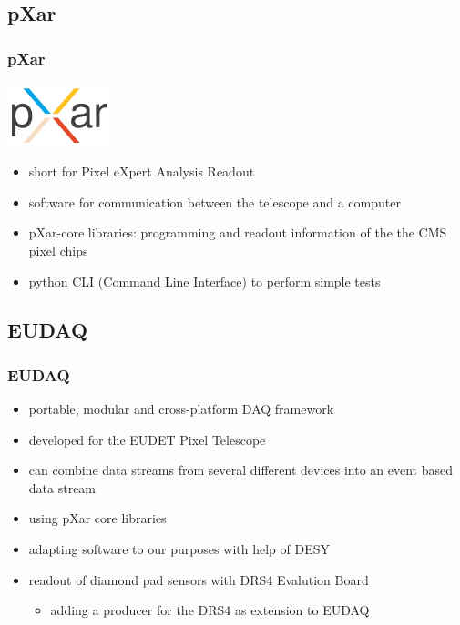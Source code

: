 \documentclass[9pt]{beamer}
\begin{document}
\subsection{pXar}
\begin{frame}
	\frametitle{pXar}
	\begin{center}
		\includegraphics[width=3cm]{Pics/pxar_logo}
	\end{center}
	\begin{itemize}
		\setlength{\itemsep}{\fill}
		\item short for Pixel eXpert Analysis Readout
		\item software for communication between the telescope and a computer
		\item pXar-core libraries: programming and readout information of the the CMS pixel chips
		\item python CLI (Command Line Interface) to perform simple tests
	\end{itemize}
\end{frame}
\subsection{EUDAQ}
\begin{frame}
	\frametitle{EUDAQ}
	\begin{itemize}
		\setlength{\itemsep}{\fill}
		\item portable, modular and cross-platform DAQ framework
		\item developed for the EUDET Pixel Telescope
		\item can combine data streams from several different devices into an event based data stream
		\item using pXar core libraries
		\item adapting software to our purposes with help of DESY
		\vspace*{1cm}
		\item readout of diamond pad sensors with DRS4 Evalution Board
		\begin{itemize}
			\item adding a producer for the DRS4 as extension to EUDAQ
		\end{itemize}
	\end{itemize}
\end{frame}
\end{document}
